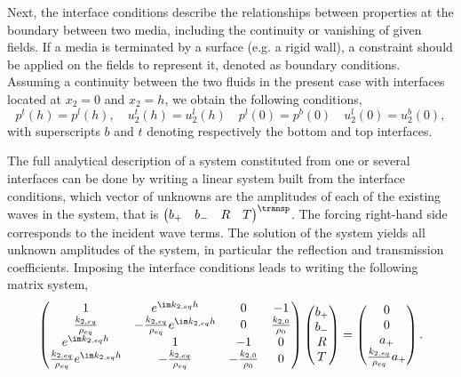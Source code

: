 Next, the interface conditions describe the relationships between properties at the boundary between two media, including the continuity or vanishing of given fields. If a media is terminated by a surface (e.g. a rigid wall), a constraint should be applied on the fields to represent it, denoted as boundary conditions. Assuming a continuity between the two fluids in the present case with interfaces located at $x_2 = 0$ and $x_2 = h$, we obtain the following conditions,
\begin{equation}
    p^t(h) = p^l(h), \quad u_{2}^t(h) = u_2^l(h) \quad p^l(0) = p^b(0) \quad u_{2}^l(0) = u_2^b(0),
\end{equation}
with superscripts $b$ and $t$ denoting respectively the bottom and top interfaces. 

The full analytical description of a system constituted from one or several interfaces can be done by writing a linear system built from the interface conditions, which vector of unknowns are the amplitudes of each of the existing waves in the system, that is $\begin{pmatrix} b_+ & b_- & R & T \end{pmatrix}^\transp$. The forcing right-hand side corresponds to the incident wave terms. The solution of the system yields all unknown amplitudes of the system, in particular the reflection and transmission coefficients. Imposing the interface conditions leads to writing the following matrix system, 
\begin{equation}
    \begin{pmatrix}
        1 & e^{\im k_{2,eq}h}& 0 & -1 \\
        \frac{k_{2,eq}}{\rho_{eq}}& -\frac{k_{2,eq}}{\rho_{eq}} e^{\im k_{2,eq}h}&   0& \frac{k_{2,0}}{\rho_0} \\
        e^{\im k_{2,eq}h}& 1 & -1 & 0 \\
        \frac{k_{2,eq}}{\rho_{eq}} e^{\im k_{2,eq}h} &    -\frac{k_{2,eq}}{\rho_{eq}}& -\frac{k_{2,0}}{\rho_{0}}&  0 
    \end{pmatrix} \begin{pmatrix} b_+ \\ b_- \\ R \\ T \end{pmatrix} = \begin{pmatrix}
        0 \\ 0 \\ a_+ \\ \frac{k_{2,eq}}{\rho_{eq}} a_+
    \end{pmatrix}. 
    \label{eq:gm_pres_layer}
\end{equation}

